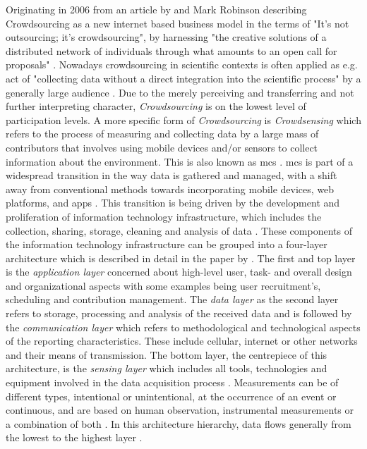 Originating in 2006 from an article by \autocite{howeRiseCrowdsourcing} and Mark Robinson describing Crowdsourcing as a new internet based business model in the terms of "It's not outsourcing; it's crowdsourcing", by harnessing "the creative solutions of a distributed network of individuals through what amounts to an open call for proposals" \autocite[76]{brabhamCrowdsourcingModelProblem2008}. Nowadays crowdsourcing in scientific contexts is often applied as e.g. act of "collecting data without a direct integration into the scientific process" by a generally large audience \autocite[1591]{weeserCitizenSciencePioneers2018a}. Due to the merely perceiving and transferring and not further interpreting character, \textit{Crowdsourcing} is on the lowest level of participation levels. A more specific form of \textit{Crowdsourcing} is \textit{Crowdsensing} which refers to the process of measuring and collecting data by a large mass of contributors that involves using mobile devices and/or sensors to collect information about the environment. This is also known as \acrfull{mcs} \autocite{guoParticipatorySensingMobile2014, liuSurveyMobileCrowdsensing2018}.
\acrshort*{mcs} is part of a widespread transition in the way data is gathered and managed, with a shift away from conventional methods towards incorporating mobile devices, web platforms, and apps \autocite{capponiSurveyMobileCrowdsensing2019, sanllorentecapdevilaSuccessFactorsCitizen2020}. This transition is being driven by the development and proliferation of information technology infrastructure, which includes the collection, sharing, storage, cleaning and analysis of data \autocite{fraislCitizenScienceEnvironmental2022}. These components of the information technology infrastructure can be grouped into a four-layer architecture which is described in detail in the paper by \autocite{capponiSurveyMobileCrowdsensing2019}.
The first and top layer is the \textit{application layer} concerned about high-level user, task- and overall design and organizational aspects with some examples being user recruitment's, scheduling and contribution management. The \textit{data layer} as the second layer refers to storage, processing and analysis of the received data and is followed by the \textit{communication layer} which refers to methodological and technological aspects of the reporting characteristics. These include cellular, internet or other networks and their means of transmission. The bottom layer, the centrepiece of this architecture, is the \textit{sensing layer} which includes all tools, technologies and equipment involved in the data acquisition process \autocite{capponiSurveyMobileCrowdsensing2019}. Measurements can be of different types, intentional or unintentional, at the occurrence of an event or continuous, and are based on human observation, instrumental measurements or a combination of both \autocite{zhengCrowdsourcingMethodsData2018}. In this architecture hierarchy, data flows generally from the lowest to the highest layer \autocite{aceves-buenoCitizenScienceApproach2015,capponiSurveyMobileCrowdsensing2019,zhengCrowdsourcingMethodsData2018}.
